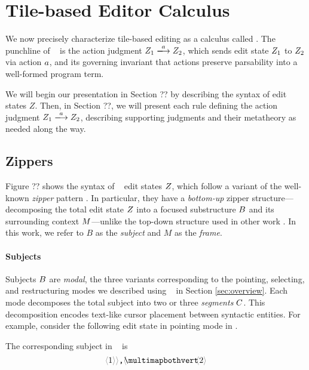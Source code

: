 \section{Tile-based Editor Calculus}\label{sec:formalism-2}

We now precisely characterize tile-based editing
as a calculus called \ty.
The punchline of \ty~ is the action judgment
$\performAction{\editState_1}{\action}{\editState_2}$,
which sends edit state $Z_1$ to $Z_2$
via action $a$, and its governing invariant
that actions preserve parsability into a well-formed
program term.

We will begin our presentation in Section ??
by describing the syntax of edit states $Z$.
Then, in Section ??, we will present each rule
defining the action judgment
$\performAction{\editState_1}{\action}{\editState_2}$,
describing supporting judgments and their metatheory
as needed along the way.

\subsection{Zippers}

Figure ?? shows the syntax of \ty~ edit states $Z$,
which follow a variant of the well-known
\emph{zipper} pattern \cite{zipper}.
In particular, they have a \emph{bottom-up} zipper
structure---decomposing the total edit state $Z$ into a
focused substructure $B$ and its surrounding context
$M$---unlike the top-down structure used in other
work .
In this work, we refer to $B$ as the \emph{subject} and $M$
as the \emph{frame}.

\paragraph{Subjects}
Subjects $B$ are \emph{modal}, the three
variants corresponding to the pointing, selecting,
and restructuring modes we described using \tylr~
in Section \ref{sec:overview}.
Each mode decomposes the total subject into two
or three \emph{segments} $C$.
This decomposition encodes text-like cursor
placement between syntactic entities.
For example, consider the following edit state
in pointing mode in \tylr.


\noindent
The corresponding subject in \ty~ is
\[
  \pointing{\optile{\snumlit{1}}\bintile{\tprod}}{\optile{\snumlit{2}}}
\]

